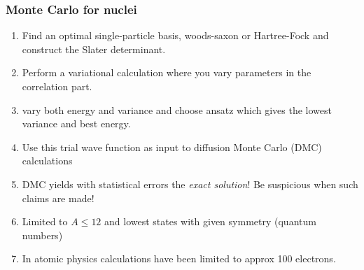 \documentclass[compress]{beamer}
\begin{document}
\frame
{
  \frametitle{Monte Carlo for nuclei}
\begin{enumerate}
\item Find an optimal single-particle basis, woods-saxon or Hartree-Fock
and construct the Slater determinant.
\item Perform a variational calculation where you vary  parameters in the correlation part. 
\item vary both energy and variance and choose ansatz which gives the lowest variance and best energy.
\item Use this trial wave function as input to diffusion Monte Carlo (DMC) calculations  
\item DMC  yields with statistical errors the {\em exact solution}! Be suspicious when such claims are made!
\item Limited to $A\le 12$ and lowest states with given symmetry (quantum numbers)
\item In atomic physics  calculations have been limited to approx 100 electrons.
\end{enumerate}
}
\end{document}
